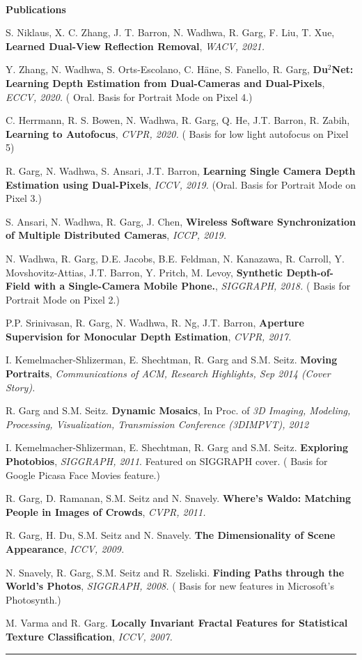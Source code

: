 \documentclass[10pt]{article}
\newenvironment{itemize*}%
  {\begin{itemize}%
    \setlength{\itemsep}{0pt}%
    \setlength{\parskip}{0pt}%
	}
  {\end{itemize}}
\begin{document}
\\
\vspace{0.10in}
{\large \textbf{Publications}}
\begin{itemize*}
\item S. Niklaus, X. C. Zhang, J. T. Barron, N. Wadhwa, R. Garg, F. Liu, T. Xue, \textbf{Learned Dual-View Reflection Removal}, \emph{WACV, 2021.}
\item Y. Zhang, N. Wadhwa, S. Orts-Escolano, C. H\"ane, S. Fanello, R. Garg, \textbf{Du$^2$Net: Learning Depth Estimation from Dual-Cameras and Dual-Pixels}, \emph{ECCV, 2020.} ({\color{red} Oral. Basis for Portrait Mode on Pixel 4.})
\item C. Herrmann, R. S. Bowen, N. Wadhwa, R. Garg, Q. He, J.T. Barron, R. Zabih, \textbf{Learning to Autofocus}, \emph{CVPR, 2020.} ({\color{red} Basis for low light autofocus on Pixel 5})
\item R. Garg, N. Wadhwa, S. Ansari, J.T. Barron, \textbf{Learning Single Camera Depth Estimation using Dual-Pixels}, \emph{ICCV, 2019.} ({\color{red}Oral. Basis for Portrait Mode on Pixel 3.})
\item S. Ansari, N. Wadhwa, R. Garg, J. Chen, \textbf{Wireless Software Synchronization of Multiple Distributed Cameras}, \emph{ICCP, 2019.}
\item N. Wadhwa, R. Garg, D.E. Jacobs, B.E. Feldman, N. Kanazawa, R. Carroll, Y. Movshovitz-Attias, J.T. Barron, Y. Pritch, M. Levoy, \textbf{Synthetic Depth-of-Field with a Single-Camera Mobile Phone.}, \emph{SIGGRAPH, 2018.} ({\color{red} Basis for Portrait Mode on Pixel 2.})
\item P.P. Srinivasan, R. Garg, N. Wadhwa, R. Ng, J.T. Barron, \textbf{Aperture Supervision for Monocular Depth Estimation}, \emph{CVPR, 2017.}
\item I. Kemelmacher-Shlizerman, E. Shechtman, R. Garg and S.M. Seitz. \textbf{Moving Portraits}, \emph{Communications of ACM, Research Highlights, Sep 2014 (Cover Story).}
\item R. Garg and S.M. Seitz. \textbf{Dynamic Mosaics}, In Proc. of \emph{3D Imaging, Modeling, Processing, Visualization, Transmission Conference (3DIMPVT), 2012}
\item I. Kemelmacher-Shlizerman, E. Shechtman, R. Garg and S.M. Seitz. \textbf{Exploring Photobios}, \emph{SIGGRAPH, 2011}. Featured on SIGGRAPH cover. ({\color{red} Basis for Google Picasa Face Movies feature.})
\item R. Garg, D. Ramanan, S.M. Seitz and N. Snavely. \textbf{Where's Waldo: Matching People in Images of Crowds}, \emph{CVPR, 2011.}
\item R. Garg, H. Du, S.M. Seitz and N. Snavely. \textbf{The Dimensionality of Scene Appearance}, \emph{ICCV, 2009.}
\item N. Snavely, R. Garg, S.M. Seitz and R. Szeliski. \textbf{Finding Paths through the World's Photos}, \emph{SIGGRAPH, 2008.} ({\color{red} Basis for new features in Microsoft's Photosynth.})
\item M. Varma and R. Garg. \textbf{Locally Invariant Fractal Features for Statistical Texture Classification}, \emph{ICCV, 2007.} 
\end{itemize*}
\rule{6.5in}{2pt}
\end{document}

